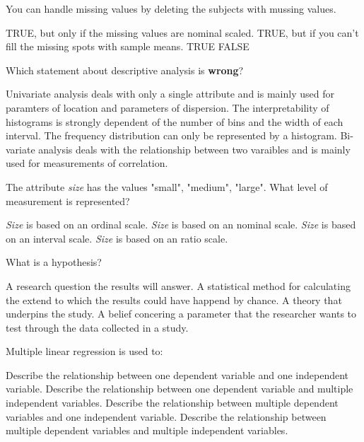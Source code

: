 \documentclass[addpoints]{exam}
\begin{document}
\begin{questions}
		\question[1] You can handle missing values by deleting the subjects with mussing values.
		\begin{checkboxes}
			\choice TRUE, but only if the missing values are nominal scaled.
			\CorrectChoice TRUE, but if you can't fill the missing spots with sample means.
			\choice TRUE
			\choice FALSE
		\end{checkboxes}
	
		\question[1] Which statement about descriptive analysis is \textbf{wrong}?
		\begin{checkboxes}
			\choice Univariate analysis deals with only a single attribute and is mainly used for paramters of location and parameters of dispersion.
			\choice The interpretability of histograms is strongly dependent of the number of bins and the width of each interval.
			\CorrectChoice The frequency distribution can only be represented by a histogram.
			\choice Bi-variate analysis deals with the relationship between two varaibles and is mainly used for measurements of correlation.
		\end{checkboxes}
	
		\question[1] The attribute \textit{size} has the values "small", "medium", "large". What level of measurement is represented?
		\begin{checkboxes}
			\CorrectChoice \textit{Size} is based on an ordinal scale.
			\choice \textit{Size} is based on an nominal scale.
			\choice \textit{Size} is based on an interval scale.
			\choice \textit{Size} is based on an ratio scale.
		\end{checkboxes}
	
		\question[1] What is a hypothesis?
		\begin{checkboxes}
			\choice A research question the results will answer.
			\choice A statistical method for calculating the extend to which the results could have happend by chance.
			\choice A theory that underpins the study.
			\CorrectChoice A belief concering a parameter that the researcher wants to test through the data collected in a study.
		\end{checkboxes}
	
		\question[1] Multiple linear regression is used to:
		\begin{checkboxes}
			\choice Describe the relationship between one dependent variable and one independent variable.
			\CorrectChoice Describe the relationship between one dependent variable and multiple independent variables.
			\choice Describe the relationship between multiple dependent variables and one independent variable.
			\choice Describe the relationship between multiple dependent variables and multiple independent variables.
		\end{checkboxes}
	

\end{questions}
\end{document}

